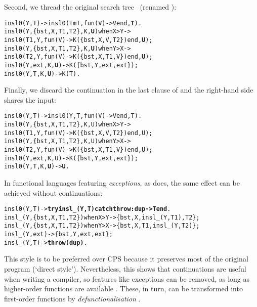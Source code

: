 Second, we thread the original search tree~ (renamed
):
\begin{alltt}
insl0(Y,T)                 -> insl0(TmT,fun(V) -> V end,\textbf{T}).
insl0(Y,\{bst,X,T1,T2\},K,\textbf{U}) when X > Y ->
\hfill{}insl0(T1,Y,fun(V) -> K(\{bst,X,V,T2\}) end,\textbf{U});
insl0(Y,\{bst,X,T1,T2\},K,\textbf{U}) when Y > X ->
\hfill{}insl0(T2,Y,fun(V) -> K(\{bst,X,T1,V\}) end,\textbf{U});
insl0(Y,          ext,K,\textbf{U}) -> K(\{bst,Y,ext,ext\});
insl0(Y,            T,K,\textbf{U}) -> K(T).
\end{alltt}
Finally, we discard the continuation in the last clause of
 and the right\hyp{}hand side shares the input:
\begin{alltt}
insl0(Y,T)                 -> insl0(Y,T,fun(V) -> V end,T).
insl0(Y,\{bst,X,T1,T2\},K,U) when X > Y ->
\hfill{}insl0(T1,Y,fun(V) -> K(\{bst,X,V,T2\}) end,U);
insl0(Y,\{bst,X,T1,T2\},K,U) when Y > X ->
\hfill{}insl0(T2,Y,fun(V) -> K(\{bst,X,T1,V\}) end,U);
insl0(Y,          ext,K,U) -> K(\{bst,Y,ext,ext\});
insl0(Y,            T,K,\textbf{U}) -> \textbf{U}.\hfill% \emph{Input shared}
\end{alltt}
In functional languages featuring \emph{exceptions}, as \Erlang does, the same effect
can be achieved without continuations:
\begin{alltt}
insl0(Y,T)\hfill{}-> \textbf{try insl\_(Y,T) catch throw:dup -> T end}.
insl\_(Y,\{bst,X,T1,T2\}) when X > Y -> \{bst,X,insl\_(Y,T1),T2\};
insl\_(Y,\{bst,X,T1,T2\}) when Y > X -> \{bst,X,T1,insl\_(Y,T2)\};
insl\_(Y,          ext)            -> \{bst,Y,ext,ext\};
insl\_(Y,            T)            -> \textbf{throw(dup)}.
\end{alltt}
This style is to be preferred over CPS because it preserves most of
the original program (`direct style'). Nevertheless, this shows that
continuations are useful when writing a compiler, so features like
exceptions can be removed, as long as higher\hyp{}order functions are
available \citep{Appel_1992}. These, in turn, can be transformed into
first\hyp{}order functions by
\emph{defunctionalisation} \citep{Reynolds_1972,DanvyNielsen_2001}.

